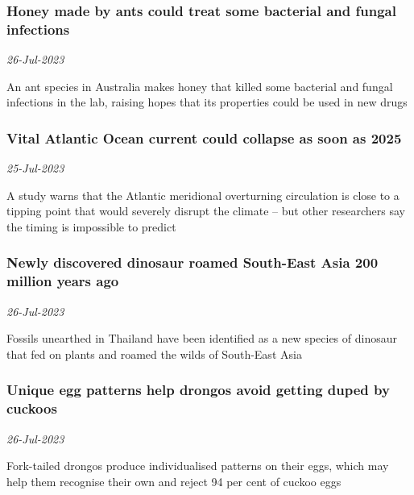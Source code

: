 \subsubsection{Honey made by ants could treat some bacterial and fungal infections \href{https://www.newscientist.com/article/2384459-honey-made-by-ants-could-treat-some-bacterial-and-fungal-infections/?utm_campaign=RSS%7CNSNS&utm_source=NSNS&utm_medium=RSS&utm_content=home}{}}
\textit{26-Jul-2023}

An ant species in Australia makes honey that killed some bacterial and fungal infections in the lab, raising hopes that its properties could be used in new drugs
\subsubsection{Vital Atlantic Ocean current could collapse as soon as 2025 \href{https://www.newscientist.com/article/2384094-vital-atlantic-ocean-current-could-collapse-as-soon-as-2025/?utm_campaign=RSS%7CNSNS&utm_source=NSNS&utm_medium=RSS&utm_content=home}{\ding{225}}}
\textit{25-Jul-2023}

A study warns that the Atlantic meridional overturning circulation is close to a tipping point that would severely disrupt the climate – but other researchers say the timing is impossible to predict
\subsubsection{Newly discovered dinosaur roamed South-East Asia 200 million years ago \href{https://www.newscientist.com/article/2383575-newly-discovered-dinosaur-roamed-south-east-asia-200-million-years-ago/?utm_campaign=RSS%7CNSNS&utm_source=NSNS&utm_medium=RSS&utm_content=home}{}}
\textit{26-Jul-2023}

Fossils unearthed in Thailand have been identified as a new species of dinosaur that fed on plants and roamed the wilds of South-East Asia
\subsubsection{Unique egg patterns help drongos avoid getting duped by cuckoos \href{https://www.newscientist.com/article/2384258-unique-egg-patterns-help-drongos-avoid-getting-duped-by-cuckoos/?utm_campaign=RSS%7CNSNS&utm_source=NSNS&utm_medium=RSS&utm_content=home}{\ding{225}}}
\textit{26-Jul-2023}

Fork-tailed drongos produce individualised patterns on their eggs, which may help them recognise their own and reject 94 per cent of cuckoo eggs

